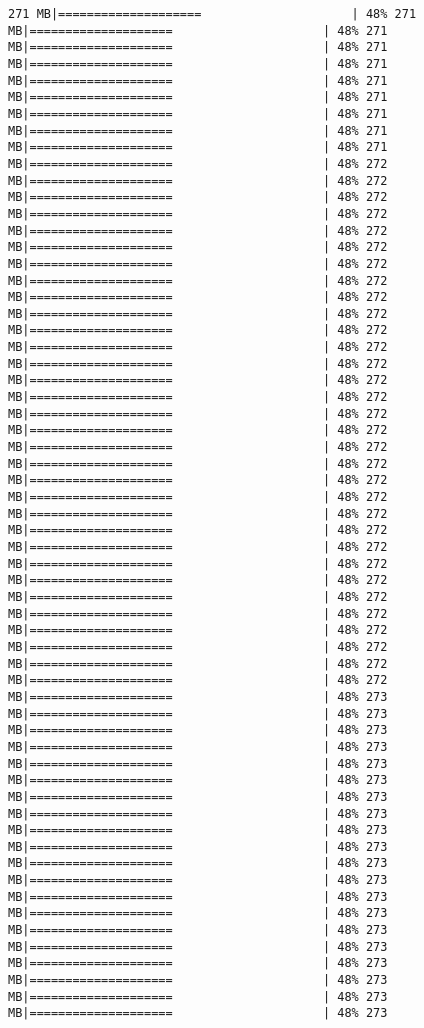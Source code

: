 \documentclass[
]{article}
\begin{document}
\begin{verbatim}
271 MB|====================                     | 48% 271 MB|====================                     | 48% 271 MB|====================                     | 48% 271 MB|====================                     | 48% 271 MB|====================                     | 48% 271 MB|====================                     | 48% 271 MB|====================                     | 48% 271 MB|====================                     | 48% 271 MB|====================                     | 48% 271 MB|====================                     | 48% 272 MB|====================                     | 48% 272 MB|====================                     | 48% 272 MB|====================                     | 48% 272 MB|====================                     | 48% 272 MB|====================                     | 48% 272 MB|====================                     | 48% 272 MB|====================                     | 48% 272 MB|====================                     | 48% 272 MB|====================                     | 48% 272 MB|====================                     | 48% 272 MB|====================                     | 48% 272 MB|====================                     | 48% 272 MB|====================                     | 48% 272 MB|====================                     | 48% 272 MB|====================                     | 48% 272 MB|====================                     | 48% 272 MB|====================                     | 48% 272 MB|====================                     | 48% 272 MB|====================                     | 48% 272 MB|====================                     | 48% 272 MB|====================                     | 48% 272 MB|====================                     | 48% 272 MB|====================                     | 48% 272 MB|====================                     | 48% 272 MB|====================                     | 48% 272 MB|====================                     | 48% 272 MB|====================                     | 48% 272 MB|====================                     | 48% 272 MB|====================                     | 48% 272 MB|====================                     | 48% 272 MB|====================                     | 48% 272 MB|====================                     | 48% 273 MB|====================                     | 48% 273 MB|====================                     | 48% 273 MB|====================                     | 48% 273 MB|====================                     | 48% 273 MB|====================                     | 48% 273 MB|====================                     | 48% 273 MB|====================                     | 48% 273 MB|====================                     | 48% 273 MB|====================                     | 48% 273 MB|====================                     | 48% 273 MB|====================                     | 48% 273 MB|====================                     | 48% 273 MB|====================                     | 48% 273 MB|====================                     | 48% 273 MB|====================                     | 48% 273 MB|====================                     | 48% 273 MB|====================                     | 48% 273 MB|====================                     | 48% 273 MB|====================                     | 48% 273 
\end{verbatim}
\end{document}

